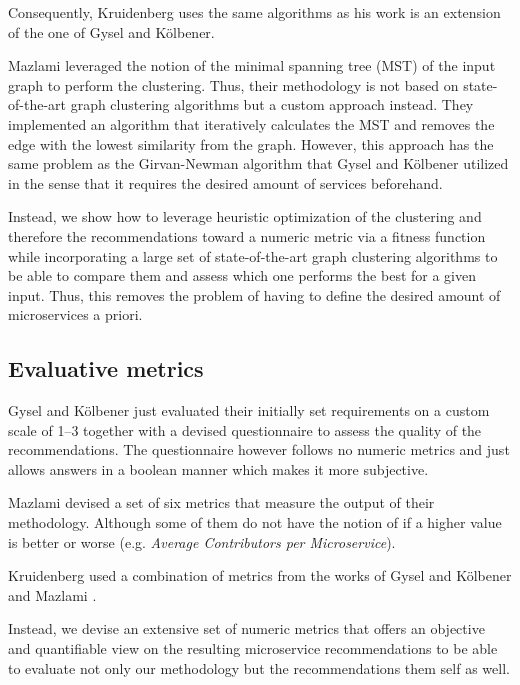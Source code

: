 \documentclass[12pt,a4paper]{report}
\begin{document}
Consequently, Kruidenberg \cite{kruidenberg2018monoliths} uses the same
algorithms as his work is an extension of the one of Gysel and K{\"o}lbener.

Mazlami \cite{mazlami2017extraction} leveraged the notion of the
minimal spanning tree (MST) of the input graph to perform the clustering.
Thus, their methodology is not based on state-of-the-art graph clustering algorithms
but a custom approach instead. They implemented an algorithm
that iteratively calculates the MST and removes the edge with the lowest similarity
from the graph. However, this approach has the same problem as the
Girvan-Newman algorithm \cite{girvan2002community} that Gysel and K{\"o}lbener
utilized in the sense that it requires the desired amount of services beforehand.

Instead, we show how to leverage heuristic optimization of the clustering and
therefore the recommendations toward a numeric metric via a fitness function
while incorporating a large set of state-of-the-art graph clustering algorithms
to be able to compare them and assess which one performs the best for a given input.
Thus, this removes the problem of having to define the desired amount of microservices
a priori.


\subsection{Evaluative metrics}

Gysel and K{\"o}lbener \cite{gysel2016service} just evaluated their
initially set requirements on a custom scale of 1--3 together with a devised
questionnaire to assess the quality of the recommendations.
The questionnaire however follows no numeric metrics and just allows answers
in a boolean manner which makes it more subjective.

Mazlami \cite{mazlami2017extraction} devised a set of six metrics that measure
the output of their methodology. Although some of them do not have the notion
of if a higher value is better or worse (e.g. \textit{Average Contributors per Microservice}).

Kruidenberg \cite{kruidenberg2018monoliths} used a combination of metrics from
the works of Gysel and K{\"o}lbener \cite{gysel2016service} and
Mazlami \cite{mazlami2017extraction}.

Instead, we devise an extensive set of numeric metrics that offers
an objective and quantifiable view on the resulting microservice recommendations
to be able to evaluate not only our methodology but the recommendations them self as well.
\end{document}
